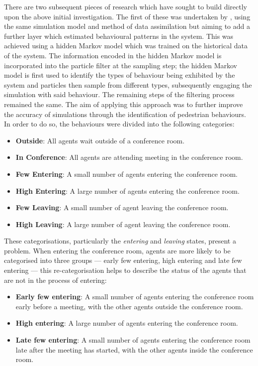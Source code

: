 There are two subsequent pieces of research which have sought to build directly
upon the above initial investigation.
The first of these was undertaken by \citet{rai2013behavior}, using the same
simulation model and method of data assimilation but aiming to add a further
layer which estimated behavioural patterns in the system.
This was achieved using a hidden Markov model which was trained on the
historical data of the system.
The information encoded in the hidden Markov model is incorporated into the
particle filter at the sampling step; the hidden Markov model is first used to
identify the types of behaviour being exhibited by the system and particles then
sample from different types, subsequently engaging the simulation with said
behaviour.
The remaining steps of the filtering process remained the same.
The aim of applying this approach was to further improve the accuracy of
simulations through the identification of pedestrian behaviours.
In order to do so, the behaviours were divided into the following categories:
\begin{itemize}
    \item \textbf{Outside}: All agents wait outside of a conference room.
    \item \textbf{In Conference}: All agents are attending meeting in the
        conference room.
    \item \textbf{Few Entering}: A small number of agents entering the
        conference room.
    \item \textbf{High Entering}: A large number of agents entering the
        conference room.
    \item \textbf{Few Leaving}: A small number of agent leaving the conference
        room.
    \item \textbf{High Leaving}: A large number of agent leaving the conference
        room.
\end{itemize}
These categorisations, particularly the \textit{entering} and \textit{leaving}
states, present a problem.
When entering the conference room, agents are more likely to be categorised
into three groups --- early few entering, high entering and late few entering
--- this re-categorisation helps to describe the status of the agents that are
not in the process of entering:
\begin{itemize}
    \item \textbf{Early few entering}: A small number of agents entering the
        conference room early before a meeting, with the other agents outside
        the conference room.
    \item \textbf{High entering}: A large number of agents entering the
        conference room.
    \item \textbf{Late few entering}: A small number of agents entering the
        conference room late after the meeting has started, with the other
        agents inside the conference room.
\end{itemize}
